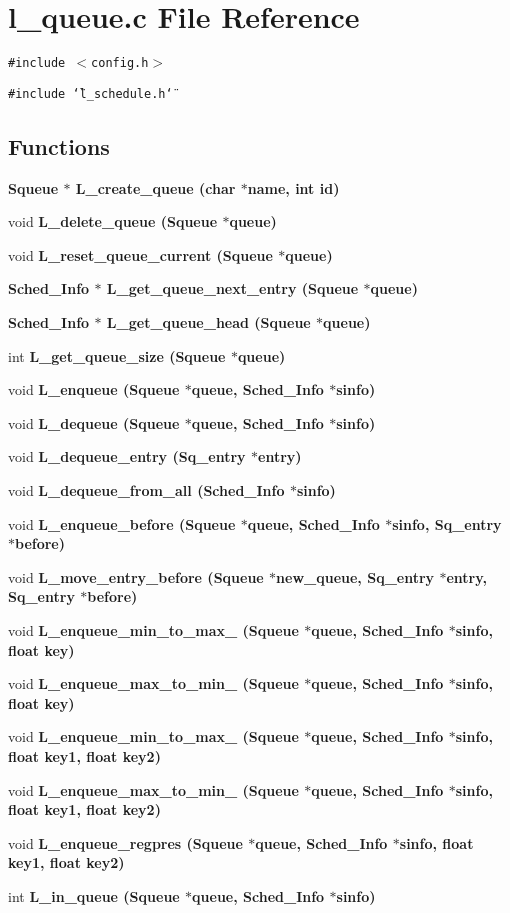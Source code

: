 \section{l\_\-queue.c File Reference}
\label{l__queue_8c}
{\tt \#include $<$config.h$>$}\par
{\tt \#include \char`\"{}l\_\-schedule.h\char`\"{}}\par
\subsection*{Functions}
\begin{CompactItemize}
\item 
\bf{Squeue} $\ast$ \bf{L\_\-create\_\-queue} (char $\ast$\bf{name}, int id)
\item 
void \bf{L\_\-delete\_\-queue} (\bf{Squeue} $\ast$queue)
\item 
void \bf{L\_\-reset\_\-queue\_\-current} (\bf{Squeue} $\ast$queue)
\item 
\bf{Sched\_\-Info} $\ast$ \bf{L\_\-get\_\-queue\_\-next\_\-entry} (\bf{Squeue} $\ast$queue)
\item 
\bf{Sched\_\-Info} $\ast$ \bf{L\_\-get\_\-queue\_\-head} (\bf{Squeue} $\ast$queue)
\item 
int \bf{L\_\-get\_\-queue\_\-size} (\bf{Squeue} $\ast$queue)
\item 
void \bf{L\_\-enqueue} (\bf{Squeue} $\ast$queue, \bf{Sched\_\-Info} $\ast$sinfo)
\item 
void \bf{L\_\-dequeue} (\bf{Squeue} $\ast$queue, \bf{Sched\_\-Info} $\ast$sinfo)
\item 
void \bf{L\_\-dequeue\_\-entry} (\bf{Sq\_\-entry} $\ast$\bf{entry})
\item 
void \bf{L\_\-dequeue\_\-from\_\-all} (\bf{Sched\_\-Info} $\ast$sinfo)
\item 
void \bf{L\_\-enqueue\_\-before} (\bf{Squeue} $\ast$queue, \bf{Sched\_\-Info} $\ast$sinfo, \bf{Sq\_\-entry} $\ast$before)
\item 
void \bf{L\_\-move\_\-entry\_\-before} (\bf{Squeue} $\ast$new\_\-queue, \bf{Sq\_\-entry} $\ast$\bf{entry}, \bf{Sq\_\-entry} $\ast$before)
\item 
void \bf{L\_\-enqueue\_\-min\_\-to\_\-max\_} (\bf{Squeue} $\ast$queue, \bf{Sched\_\-Info} $\ast$sinfo, float key)
\item 
void \bf{L\_\-enqueue\_\-max\_\-to\_\-min\_} (\bf{Squeue} $\ast$queue, \bf{Sched\_\-Info} $\ast$sinfo, float key)
\item 
void \bf{L\_\-enqueue\_\-min\_\-to\_\-max\_} (\bf{Squeue} $\ast$queue, \bf{Sched\_\-Info} $\ast$sinfo, float key1, float key2)
\item 
void \bf{L\_\-enqueue\_\-max\_\-to\_\-min\_} (\bf{Squeue} $\ast$queue, \bf{Sched\_\-Info} $\ast$sinfo, float key1, float key2)
\item 
void \bf{L\_\-enqueue\_\-regpres} (\bf{Squeue} $\ast$queue, \bf{Sched\_\-Info} $\ast$sinfo, float key1, float key2)
\item 
int \bf{L\_\-in\_\-queue} (\bf{Squeue} $\ast$queue, \bf{Sched\_\-Info} $\ast$sinfo)
\end{CompactItemize}


